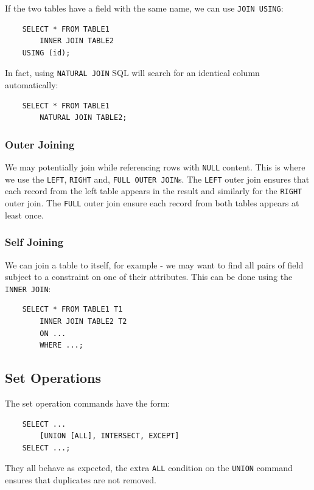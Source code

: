 \newpage
\noindent
If the two tables have a field with the same
name, we can use \texttt{JOIN USING}: \begin{lstlisting}
    SELECT * FROM TABLE1 
        INNER JOIN TABLE2
    USING (id);
\end{lstlisting} In fact, using \texttt{NATURAL JOIN} SQL will
search for an identical column automatically: \begin{lstlisting}
    SELECT * FROM TABLE1 
        NATURAL JOIN TABLE2;
\end{lstlisting}

\subsubsection{Outer Joining}

We may potentially join while referencing rows with \texttt{NULL}
content. This is where we use the \texttt{LEFT}, \texttt{RIGHT}
and, \texttt{FULL OUTER JOIN}s. The \texttt{LEFT} outer join
ensures that each record from the left table appears in the
result and similarly for the \texttt{RIGHT} outer join.
The \texttt{FULL} outer join ensure each record from both tables
appears at least once.

\subsubsection{Self Joining}

We can join a table to itself, for example - we may want to
find all pairs of field subject to a constraint on one
of their attributes. This can be done using the \texttt{INNER JOIN}:
\begin{lstlisting}
    SELECT * FROM TABLE1 T1
        INNER JOIN TABLE2 T2
        ON ...
        WHERE ...;
\end{lstlisting}

\subsection{Set Operations}

The set operation commands have the form: \begin{lstlisting}
    SELECT ...
        [UNION [ALL], INTERSECT, EXCEPT]
    SELECT ...;
\end{lstlisting} They all behave as expected, the extra \texttt{ALL}
condition on the \texttt{UNION} command ensures that duplicates
are not removed.